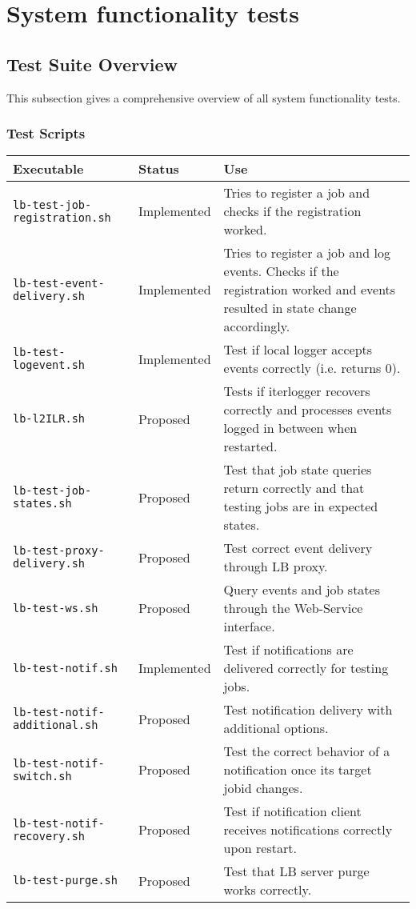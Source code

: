 
\section{System functionality tests}
\label{s:functionality}

\subsection{Test Suite Overview}

This subsection gives a comprehensive overview of all system functionality tests.

\subsubsection{Test Scripts}

\begin{tabularx}{\textwidth}{|l|l|X|}
\hline
     {\bf Executable} & {\bf Status} & {\bf Use} \\
\hline
{\tt lb-test-job-registration.sh} & Implemented & Tries to register a job and checks if the registration worked. \\
\hline
{\tt lb-test-event-delivery.sh} & Implemented & Tries to register a job and log events. Checks if the registration worked and events resulted in state change accordingly. \\
\hline
{\tt lb-test-logevent.sh} & Implemented & Test if local logger accepts events correctly (i.e. returns 0). \\
\hline
{\tt lb-l2ILR.sh} & Proposed & Tests if iterlogger recovers correctly and processes events logged in between when restarted. \\
\hline
{\tt lb-test-job-states.sh} & Proposed & Test that job state queries return correctly and that testing jobs are in expected states. \\
\hline
{\tt lb-test-proxy-delivery.sh} & Proposed & Test correct event delivery through LB proxy. \\
\hline
{\tt lb-test-ws.sh} & Proposed & Query events and job states through the Web-Service interface. \\
\hline
{\tt lb-test-notif.sh} & Implemented & Test if notifications are delivered correctly for testing jobs. \\
\hline
{\tt lb-test-notif-additional.sh} & Proposed & Test notification delivery with additional options. \\
\hline
{\tt lb-test-notif-switch.sh} & Proposed & Test the correct behavior of a notification once its target jobid changes.  \\
\hline
{\tt lb-test-notif-recovery.sh} & Proposed & Test if notification client receives notifications correctly upon restart.  \\
\hline
{\tt lb-test-purge.sh} & Proposed & Test that LB server purge works correctly. \\
\hline
\end{tabularx}

